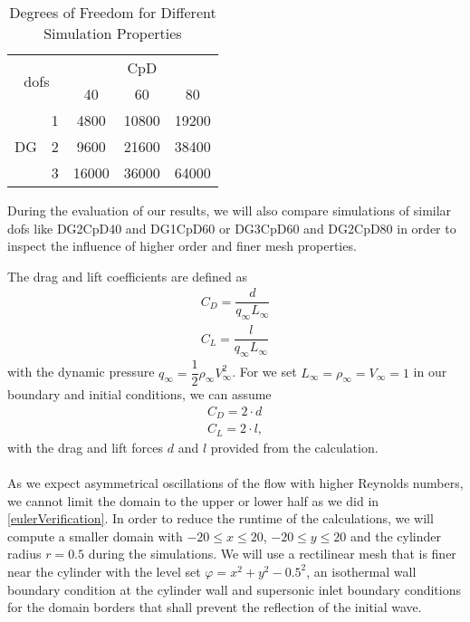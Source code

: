 	\begin{table}[htp]
		\centering
		\def\arraystretch{1.5}
			\begin{tabular}{|c|c|c|c|c|}
				\hline
				\multicolumn{2}{|c|}{\multirow{2}{*}{\glspl{dof}}} & \multicolumn{3}{c|}{CpD} \\ \cline{3-5} 
				\multicolumn{2}{|c|}{}                       & 40     & 60    & 80    \\ \hline
				\multirow{3}{*}{DG}            & 1           &    4800    &    10800   &    19200    \\ \cline{2-5} 
				& 2           &    9600    &   21600    &    38400    \\ \cline{2-5} 
				& 3           &      16000  &   36000    &   64000     \\ \hline
			\end{tabular}
			\caption{Degrees of Freedom for Different Simulation Properties}	
			\label{DOF}
	\end{table}
	During the evaluation of our results, we will also compare simulations of similar \glspl{dof} like DG2CpD40 and DG1CpD60 or DG3CpD60 and DG2CpD80 in order to inspect the influence of higher order and finer mesh properties.
	
	 The drag and lift coefficients are defined as
	\begin{align}
		C_D = \dfrac{d}{q_\infty L_\infty} \\
		C_L = \dfrac{l}{q_\infty L_\infty}
	\end{align}
	with the dynamic pressure $q_\infty = \dfrac{1}{2} \rho_\infty V_\infty^2$. For we set $L_\infty = \rho_\infty = V_\infty = 1$ in our boundary and initial conditions, we can assume
	\begin{align}
		C_D = 2 \cdot d \\
		C_L = 2 \cdot l,
	\end{align}
	with the drag and lift forces $d$ and $l$ provided from the calculation. \\\\
	As we expect asymmetrical oscillations of the flow with higher Reynolds numbers, we cannot limit the domain to the upper or lower half as we did in \cref{eulerVerification}. In order to reduce the runtime of the calculations, we will compute a smaller domain with $-20 \leq x \leq 20$, $-20 \leq y \leq 20$ and the cylinder radius $r = 0.5$ during the simulations.
	We will use a rectilinear mesh that is finer near the cylinder with the level set $\varphi = x^2 + y^2 -0.5^2$, an isothermal wall boundary condition at the cylinder wall and supersonic inlet boundary conditions for the domain borders that shall prevent the reflection of the initial wave.  \\\\
		
